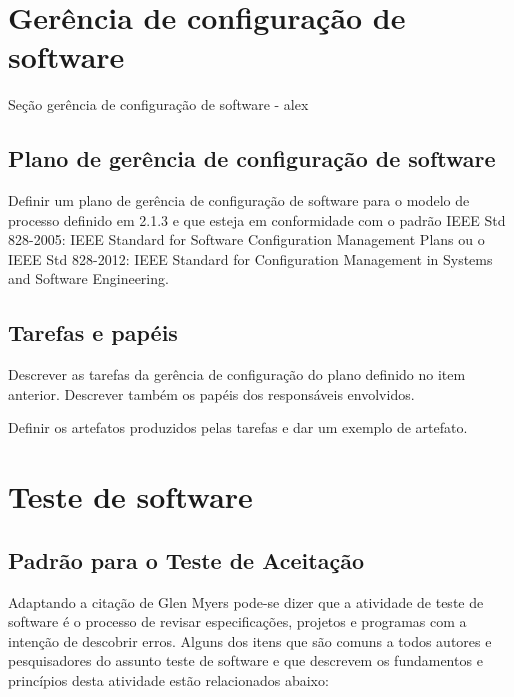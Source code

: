 \section{Gerência de configuração de software}
\label{sec:gerenciaconfig}

\large{Seção gerência de configuração de software - alex}

\subsection{Plano de gerência de configuração de software}

Definir um plano de gerência de configuração de software
para o modelo de processo definido em 2.1.3 e que esteja
em conformidade com o padrão IEEE Std 828-2005: IEEE
Standard for Software Configuration Management Plans ou
o IEEE Std 828-2012: IEEE Standard for Configuration
Management in Systems and Software Engineering.

\subsection{Tarefas e papéis}

Descrever as tarefas da gerência de configuração do plano
definido no item anterior. Descrever também os papéis dos
responsáveis envolvidos.

Definir os artefatos produzidos pelas tarefas e dar um
exemplo de artefato.



\section{Teste de software}
\label{sec:teste}

\subsection{Padrão para o Teste de Aceitação}

Adaptando a citação de Glen Myers \cite{Myers:2004:AST:983238} pode-se dizer que a atividade de teste de software é o processo de revisar especificações, projetos e programas com a intenção de descobrir erros. Alguns dos itens que são comuns a todos autores e pesquisadores do assunto teste de software e que descrevem os fundamentos e princípios desta atividade estão relacionados abaixo:

